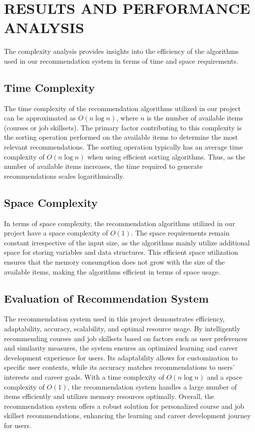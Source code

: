 
\chapter{\uppercase{Results and Performance Analysis}} %
\label{chap5}
The complexity analysis provides insights into the efficiency of the algorithms used in our recommendation system in terms of time and space requirements.

\section{Time Complexity}

The time complexity of the recommendation algorithms utilized in our project can be approximated as $O(n \log n)$, where $n$ is the number of available items (courses or job skillsets). The primary factor contributing to this complexity is the sorting operation performed on the available items to determine the most relevant recommendations. The sorting operation typically has an average time complexity of $O(n \log n)$ when using efficient sorting algorithms. Thus, as the number of available items increases, the time required to generate recommendations scales logarithmically.

\section{Space Complexity}

In terms of space complexity, the recommendation algorithms utilized in our project have a space complexity of $O(1)$. The space requirements remain constant irrespective of the input size, as the algorithms mainly utilize additional space for storing variables and data structures. This efficient space utilization ensures that the memory consumption does not grow with the size of the available items, making the algorithms efficient in terms of space usage.

\section{Evaluation of Recommendation System}

The recommendation system used in this project demonstrates efficiency, adaptability, accuracy, scalability, and optimal resource usage. By intelligently recommending courses and job skillsets based on factors such as user preferences and similarity measures, the system ensures an optimized learning and career development experience for users. Its adaptability allows for customization to specific user contexts, while its accuracy matches recommendations to users' interests and career goals. With a time complexity of $O(n \log n)$ and a space complexity of $O(1)$, the recommendation system handles a large number of items efficiently and utilizes memory resources optimally. Overall, the recommendation system offers a robust solution for personalized course and job skillset recommendations, enhancing the learning and career development journey for users.
